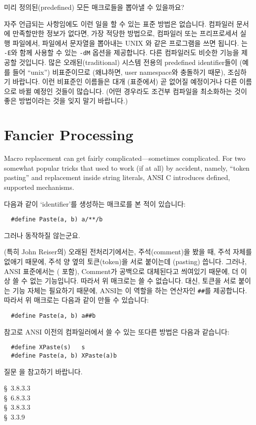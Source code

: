 \begin{faq}
	미리 정의된(predefined) 모든 매크로들을 뽑아낼 수 있을까요?

\A
	자주 언급되는 사항임에도 이런 일을 할 수 있는 표준 방법은 없습니다.
        컴파일러 문서에 만족할만한 정보가 없다면, 가장 적당한 방법으로,
        컴파일러 또는 프리프로세서 실행 파일에서, 파일에서 문자열을 뽑아내는
        UNIX 와 같은 프로그램을 쓰면 됩니다. 
        는 \verb+-E+와 함께 사용할 수 있는 \verb+-dM+ 옵션을
	제공합니다.  다른 컴파일러도 비슷한 기능을 제공할 것입니다.
        많은
        오래된(traditional) 시스템 전용의 predefined identifier들이 (예를 들어
        ``unix'') 비표준이므로 (왜냐하면, user namespace와 충돌하기 때문),
        조심하기 바랍니다. 이런 비표준인 이름들은 대개 (표준에서) 곧 없어질
        예정이거나 다른 이름으로 바뀔 예정인 것들이 많습니다. (어떤 경우라도
        조건부 컴파일을 최소화하는 것이 좋은 방법이라는 것을 잊지 말기
        바랍니다.)
\end{faq}

\section{Fancier Processing}
Macro replacement can get fairly complicated---sometimes  complicated.
For two somewhat popular tricks that used to work (if at all) by accident,
namely, ``token pasting'' and replacement inside string literals, ANSI C
introduces defined, supported mechanisms.

\begin{faq}
	다음과 같이 `identifier'를 생성하는 매크로를 본 적이
	있습니다:
\begin{verbatim}
  #define Paste(a, b) a/**/b
\end{verbatim}
	\noindent 그러나 동작하질 않는군요.

\A
	(특히 John Reiser의) 오래된 전처리기에서는, 주석(comment)을
	봤을 때, 주석 자체를 없애기 때문에, 주석 양 옆의 토큰(token)을
        서로 붙이는데 (pasting) 씁니다. 그러나, ANSI 표준에서는
        (\cite{kr1} 포함), Comment가 공백으로 대체된다고 씌여있기 때문에,
        더 이상 쓸 수 없는 기능입니다. 따라서 위  매크로는
        쓸 수 없습니다. 대신, 토큰을 서로 붙이는 기능 자체는 필요하기 때문에,
        ANSI는 이 역할을 하는 연산자인 \verb+##+를 제공합니다. 따라서
        위 매크로는 다음과 같이 만들 수 있습니다:
\begin{verbatim}
  #define Paste(a, b) a##b
\end{verbatim}

	참고로 ANSI 이전의 컴파일러에서 쓸 수 있는 또다른 방법은 다음과
        같습니다:
\begin{verbatim}
  #define XPaste(s)   s
  #define Paste(a, b) XPaste(a)b
\end{verbatim}
	질문 을 참고하기 바랍니다.

\R
	\cite{ansi} \S\ 3.8.3.3 \\
	\cite{c89} \S\ 6.8.3.3 \\
	\cite{rationale} \S\ 3.8.3.3 \\
	\cite{hs} \S\ 3.3.9 
\end{faq}

